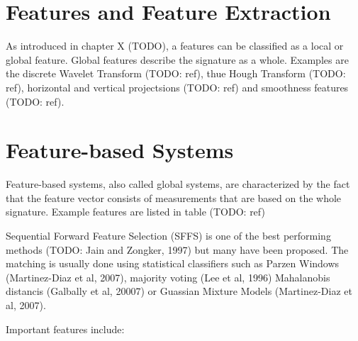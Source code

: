 \documentclass[a4paper, oneside]{csthesis}
\begin{document}


\section{Features and Feature Extraction}


As introduced in chapter X (TODO), a features can be classified as a local or global feature. Global features describe the signature as a whole. Examples are the discrete Wavelet Transform (TODO: ref), thue Hough Transform (TODO: ref), horizontal and vertical projectsions (TODO: ref) and smoothness features (TODO: ref).



\section{Feature-based Systems}

Feature-based systems, also called global systems, are characterized by the fact that the feature vector consists of measurements that are based on the whole signature. Example features are listed in table (TODO: ref)

Sequential Forward Feature Selection (SFFS) is one of the best performing methods (TODO: Jain and Zongker, 1997) but many have been proposed. The matching is usually done using statistical classifiers such as Parzen Windows (Martinez-Diaz et al, 2007), majority voting (Lee et al, 1996) Mahalanobis distancis (Galbally et al, 20007) or Guassian Mixture Models (Martinez-Diaz et al, 2007).

Important features include: \cite{Gueler2008940}
\end{document}
